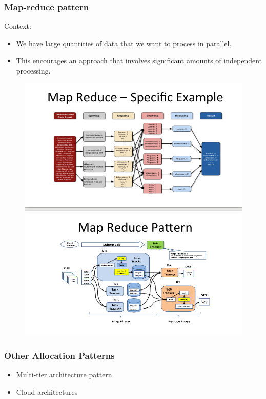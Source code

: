 \documentclass{article}
\begin{document}
\subsubsection{Map-reduce pattern}

Context:
\begin{itemize}
\item
  We have large quantities of data that we want to process in parallel.
\item
  This encourages an approach that involves significant amounts of independent processing.
\end{itemize}

\begin{figure}[H]
\centering
  \includegraphics[width=1\linewidth]
  {images/mapreduce.png}
\end{figure}

\subsubsection{Other Allocation Patterns}

\begin{itemize}
\item
  Multi-tier architecture pattern
\item
  Cloud architectures
\end{itemize}
\end{document}
